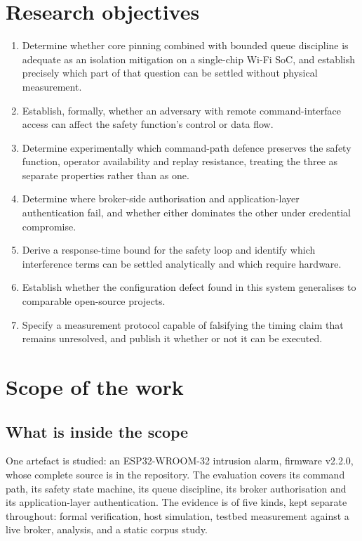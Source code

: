 \section{Research objectives}

\begin{enumerate}[leftmargin=2.2em,itemsep=4pt,label=\textbf{O\arabic*.}]
  \item Determine whether core pinning combined with bounded queue discipline is adequate as an
        isolation mitigation on a single-chip Wi-Fi SoC, and establish precisely which part of
        that question can be settled without physical measurement.
  \item Establish, formally, whether an adversary with remote command-interface access can
        affect the safety function's control or data flow.
  \item Determine experimentally which command-path defence preserves the safety function,
        operator availability and replay resistance, treating the three as separate properties
        rather than as one.
  \item Determine where broker-side authorisation and application-layer authentication fail,
        and whether either dominates the other under credential compromise.
  \item Derive a response-time bound for the safety loop and identify which interference terms
        can be settled analytically and which require hardware.
  \item Establish whether the configuration defect found in this system generalises to
        comparable open-source projects.
  \item Specify a measurement protocol capable of falsifying the timing claim that remains
        unresolved, and publish it whether or not it can be executed.
\end{enumerate}

\section{Scope of the work}\label{sec:intro-scope}

\subsection*{What is inside the scope}

One artefact is studied: an ESP32-WROOM-32 intrusion alarm, firmware v2.2.0, whose complete
source is in the repository. The evaluation covers its command path, its safety state machine,
its queue discipline, its broker authorisation and its application-layer authentication. The
evidence is of five kinds, kept separate throughout: formal verification, host simulation,
testbed measurement against a live broker, analysis, and a static corpus study.

